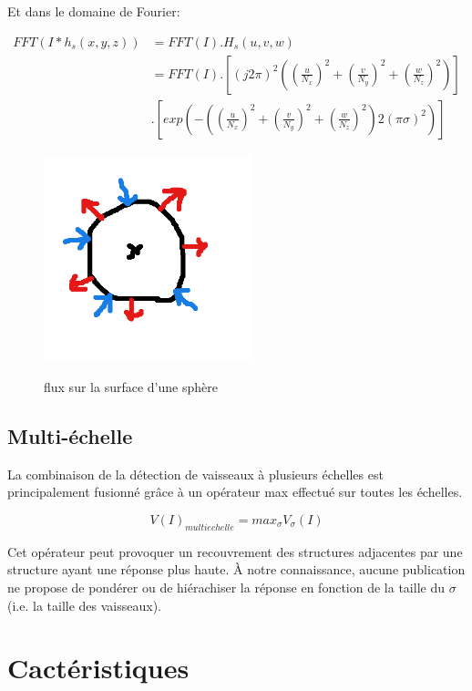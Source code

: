   Et dans le domaine de Fourier:
  
  \begin{align}
    FFT( I * h_s(x,y,z) ) &= FFT(I) . H_s(u,v,w) \\
                         &= FFT(I) . [ (j2 \pi)^2 ( (\frac{u}{N_x})^2 + (\frac{v}{N_y})^2 + (\frac{w}{N_z})^2 ) ] \\
                         & . [ exp( -( (\frac{u}{N_x})^2 + (\frac{v}{N_y})^2 + (\frac{w}{N_z})^2 ) 2(\pi\sigma)^2 ) ]
  \end{align}
  
  \begin{figure}[h]
    \centering
    \includegraphics[height=6cm]{Images/flux.png}
    \label{fig:flux_sphere}
    \caption{flux sur la surface d'une sphère}
  \end{figure}
  
  \subsection{Multi-échelle}
  \label{sec:EA:rehaussement:echelle:multiScale}
  
  La combinaison de la détection de vaisseaux à plusieurs échelles est principalement fusionné grâce à un opérateur max effectué sur toutes les échelles.
  
  \begin{equation}
    V(I)_{multi echelle} = max_{\sigma}V_{\sigma}(I)
  \end{equation}
  
  Cet opérateur peut provoquer un recouvrement des structures adjacentes par une structure ayant une réponse plus haute. À notre connaissance, aucune publication ne propose de pondérer ou de hiérachiser la réponse en fonction de la taille du $\sigma$ (i.e. la taille des vaisseaux).


\section{Cactéristiques}



